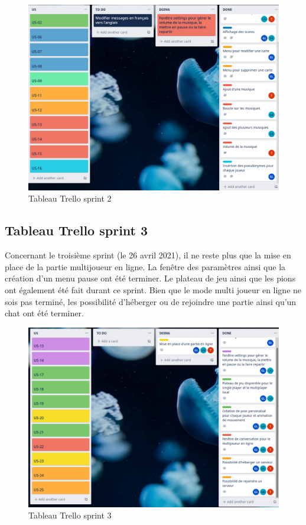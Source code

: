 \begin{figure}[h]
	\centering
	\includegraphics[width=\textwidth]{trello2.png}
	\caption{Tableau Trello sprint 2}
	\label{fig:Trello_sprint_2}
\end{figure}

\newpage
\subsection{Tableau Trello sprint 3}
Concernant le troisième sprint (le 26 avril 2021), il ne reste plus que la mise en place de la partie multijoueur en ligne.
La fenêtre des paramètres ainsi que la création d'un menu pause ont été terminer. 
Le plateau de jeu ainsi que les pions ont également été fait durant ce sprint.
Bien que le mode multi joueur en ligne ne sois pas terminé, les possibilité d'héberger ou de rejoindre une partie ainsi qu'un chat ont été terminer.

\begin{figure}[h]
	\centering
	\includegraphics[width=\textwidth]{trello3.png}
	\caption{Tableau Trello sprint 3}
	\label{fig:Trello_sprint_3}
\end{figure}